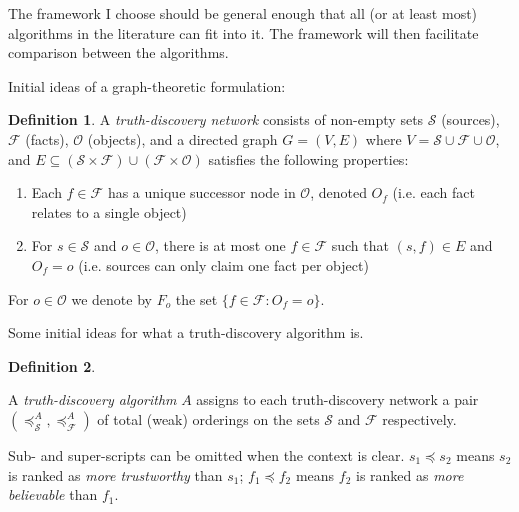 \documentclass{article}
\theoremstyle{definition}
\newtheorem{definition}{Definition}
\theoremstyle{plain}
\begin{document}
The framework I choose should be general enough that all (or at least most)
algorithms in the literature can fit into it. The framework will then
facilitate comparison between the algorithms.

Initial ideas of a graph-theoretic formulation:

\begin{definition}

A \emph{truth-discovery network} consists of non-empty sets $\mathcal{S}$
(sources), $\mathcal{F}$ (facts), $\mathcal{O}$ (objects), and a directed graph
$G=(V, E)$ where $V = \mathcal{S} \cup \mathcal{F} \cup \mathcal{O}$, and $E
\subseteq (\mathcal{S} \times \mathcal{F}) \cup (\mathcal{F} \times
\mathcal{O})$ satisfies the following properties:

\begin{enumerate}

\item Each $f \in \mathcal{F}$ has a unique successor node in $\mathcal{O}$,
denoted $O_f$ (i.e. each fact relates to a single object)

\item For $s \in \mathcal{S}$ and $o \in \mathcal{O}$, there is at most one $f
\in \mathcal{F}$ such that $(s, f) \in E$ and $O_f = o$ (i.e. sources can only
claim one fact per object)

\end{enumerate}

For $o \in \mathcal{O}$ we denote by $F_o$ the set $\{f \in \mathcal{F} : O_f =
o \}$.

\end{definition}

Some initial ideas for what a truth-discovery algorithm is.

\begin{definition}
\label{def:ordinal}

A \emph{truth-discovery algorithm} $A$ assigns to each truth-discovery network
a pair $(\preceq_\mathcal{S}^A, \preceq_\mathcal{F}^A)$ of total (weak)
orderings on the sets $\mathcal{S}$ and $\mathcal{F}$ respectively.

Sub- and super-scripts can be omitted when the context is clear. $s_1 \preceq
s_2$ means $s_2$ is ranked as \emph{more trustworthy} than $s_1$; $f_1 \preceq
f_2$ means $f_2$ is ranked as \emph{more believable} than $f_1$.

\end{definition}
\end{document}
